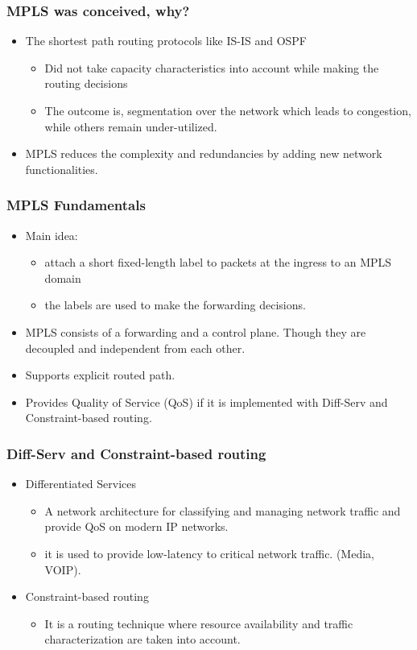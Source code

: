 \documentclass[12pt]{beamer}
\begin{document}
\begin{frame}
  \frametitle{MPLS was conceived, why?}
  	\begin{itemize}
  		\item The shortest path routing protocols like IS-IS and OSPF
  			\begin{itemize}
  				\item Did not take capacity characteristics into account while
  				making the routing decisions
  				\item The outcome is, segmentation over the network which leads
  				to congestion, while others remain under-utilized.
  			\end{itemize}
  		\item MPLS reduces the complexity and redundancies by adding new network
  		functionalities.
  	\end{itemize}
\end{frame}

\begin{frame}
  \frametitle{MPLS Fundamentals}

  \begin{itemize}
  \item Main idea:
  		\begin{itemize}
  			\item attach a short fixed-length label to packets at the ingress to an MPLS domain
  			\item the labels are used to make the forwarding decisions.
  		\end{itemize}
  	\item MPLS consists of a forwarding and a control plane. Though they are decoupled
  	and independent from each other.
  	\item Supports explicit routed path.
  	\item Provides Quality of Service (QoS) if it is implemented with Diff-Serv and Constraint-based routing.

  \end{itemize}
\end{frame}


\begin{frame}
	\frametitle{Diff-Serv and Constraint-based routing}
		\begin{itemize}
			\item Differentiated Services
				\begin{itemize}
					\item A network architecture for classifying and managing network traffic and provide QoS on modern IP networks.
					\item it is used to provide low-latency to critical network traffic. (Media, VOIP).
				\end{itemize}
			\item Constraint-based routing
				\begin{itemize}
					\item It is a routing technique where resource availability and traffic characterization are taken into account.
				\end{itemize}
		\end{itemize}

\end{frame}
\end{document}
